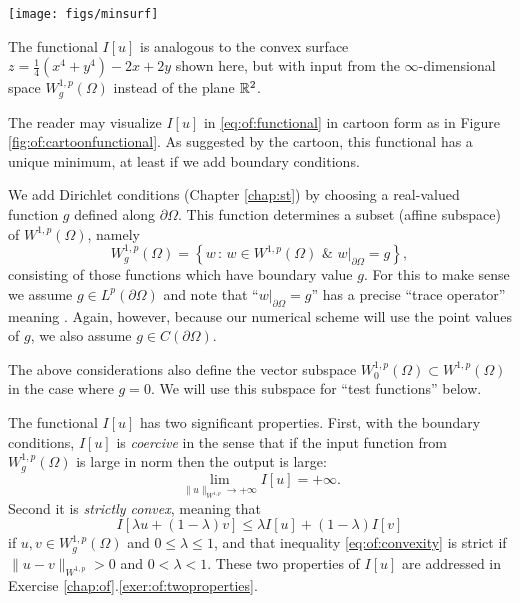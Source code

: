 \begin{marginfigure}
\texttt{[image: figs/minsurf]} %
\medskip
\caption{The functional $I[u]$ is analogous to the convex surface $z = \tfrac{1}{4}(x^4 + y^4) - 2x + 2y$ shown here, but with input from the $\infty$-dimensional space $W_g^{1,p}(\Omega)$ instead of the plane $\mathbb{R}^2$.}
\label{fig:of:cartoonfunctional}
\end{marginfigure}

The reader may visualize $I[u]$ in \eqref{eq:of:functional} in cartoon form as in Figure \ref{fig:of:cartoonfunctional}.  As suggested by the cartoon, this functional has a unique minimum, at least if we add boundary conditions.

We add Dirichlet conditions (Chapter \ref{chap:st}) by choosing a real-valued function $g$ defined along $\partial \Omega$.  This function determines a subset (affine subspace) of $W^{1,p}(\Omega)$, namely
\begin{equation}
    W_g^{1,p}(\Omega) = \left\{w \,:\, w \in W^{1,p}(\Omega) \,\, \& \,\, w\big|_{\partial \Omega} = g\right\},  \label{eq:of:affinedirichlet}
\end{equation}
consisting of those functions which have boundary value $g$.  For this to make sense we assume $g \in L^p(\partial \Omega)$ and note that ``$w\big|_{\partial \Omega} = g$'' has a precise ``trace operator'' meaning \citep[section 5.5]{Evans2010}.  Again, however, because our numerical scheme will use the point values of $g$, we also assume $g\in C(\partial\Omega)$.

The above considerations also define the vector subspace $W_0^{1,p}(\Omega) \subset W^{1,p}(\Omega)$ in the case where $g=0$.  We will use this subspace for ``test functions'' below.

The functional $I[u]$ has two significant properties.  First, with the boundary conditions, $I[u]$ is \emph{coercive} in the sense that if the input function from $W_g^{1,p}(\Omega)$ is large in norm then the output is large:
\begin{equation}
\lim_{\|u\|_{W^{1,p}} \to +\infty} I[u] = +\infty.   \label{eq:of:coercivity}
\end{equation}
Second it is \emph{strictly convex}, meaning that
\begin{equation}
I[\lambda u + (1-\lambda) v] \le \lambda I[u] + (1-\lambda) I[v]    \label{eq:of:convexity}
\end{equation}
if $u,v\in W_g^{1,p}(\Omega)$ and $0 \le \lambda \le 1$, and that inequality \eqref{eq:of:convexity} is strict if $\|u-v\|_{W^{1,p}} > 0$ and $0 < \lambda < 1$.
These two properties of $I[u]$ are addressed in Exercise \ref{chap:of}.\ref{exer:of:twoproperties}.

